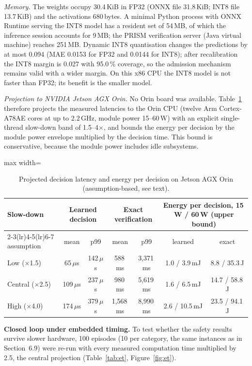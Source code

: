 \documentclass[11pt]{article}
\begin{document}
\emph{Memory.} The weights occupy 30.4\,KiB in FP32 (ONNX file 31.8\,KiB; INT8 file
13.7\,KiB) and the activations 680\,bytes. A minimal Python process with ONNX Runtime serving
the INT8 model has a resident set of 54\,MB, of which the inference session accounts for
9\,MB; the PRISM verification server (Java virtual machine) reaches 251\,MB.
Dynamic INT8 quantisation changes the predictions by at most 0.094 (MAE
0.0153 for FP32 and 0.0144 for INT8); after recalibration the INT8 margin is
0.027 with 95.0\,\% coverage, so the admission mechanism remains valid with a
wider margin. On this x86 CPU the INT8 model is not faster than FP32; its benefit is the smaller model.

\emph{Projection to NVIDIA Jetson AGX Orin.} No Orin board was available. Table~\ref{tab:orin} therefore projects the measured latencies to the Orin
CPU (twelve Arm Cortex-A78AE cores at up to 2.2\,GHz, module power 15--60\,W) with an explicit single-thread slow-down band of 1.5--4$\times$, and
bounds the energy per decision by the module power envelope multiplied by the decision time. This bound is conservative, because the module power
includes idle subsystems.

\begin{table}[h]
\centering\small
\caption{Projected decision latency and energy per decision on Jetson AGX Orin (assumption-based, see text).}\label{tab:orin}
\begin{adjustbox}{max width=\linewidth}
\begin{tabular}{lcccccc}
\toprule
Slow-down & \multicolumn{2}{c}{Learned decision} & \multicolumn{2}{c}{Exact verification} & \multicolumn{2}{c}{Energy per decision, 15\,W / 60\,W (upper bound)} \\
\cmidrule(lr){2-3}\cmidrule(lr){4-5}\cmidrule(lr){6-7}
assumption & mean & p99 & mean & p99 & learned & exact \\
\midrule
Low ($\times$1.5) & 65\,$\mu$s & 142\,$\mu$s & 588\,ms & 3,371\,ms & 1.0 / 3.9\,mJ & 8.8 / 35.3\,J \\
Central ($\times$2.5) & 109\,$\mu$s & 237\,$\mu$s & 980\,ms & 5,619\,ms & 1.6 / 6.5\,mJ & 14.7 / 58.8\,J \\
High ($\times$4.0) & 174\,$\mu$s & 379\,$\mu$s & 1,568\,ms & 8,990\,ms & 2.6 / 10.5\,mJ & 23.5 / 94.1\,J \\
\bottomrule
\end{tabular}
\end{adjustbox}
\end{table}

\textbf{Closed loop under embedded timing.} To test whether the safety results survive slower hardware, 100 episodes (10 per category, the same
instances as in Section~6.9) were re-run with every measured computation time multiplied by 2.5, the central projection (Table~\ref{tab:et},
Figure~\ref{fig:et}).
\end{document}
